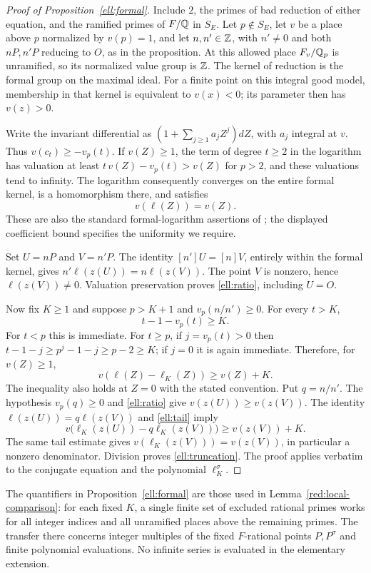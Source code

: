 \begin{proof}[Proof of Proposition~\ref{ell:formal}]
Include $2$, the primes of bad reduction of either equation, and the
ramified primes of $F/\mathbb Q$ in $S_E$.  Let $p\notin S_E$, let $v$ be a
place above $p$ normalized by $v(p)=1$, and let $n,n'\in\mathbb Z$, with
$n'\ne0$ and both $nP,n'P$ reducing to $O$, as in the proposition.
At this allowed place $F_v/\mathbb Q_p$ is
unramified, so its normalized value group is $\mathbb Z$.  The kernel of
reduction is the formal group on the maximal ideal.  For a finite point
on this integral good model, membership in that kernel is equivalent to
$v(x)<0$; its parameter then has $v(z)>0$.

Write the invariant differential as
$(1+\sum_{j\ge1}a_jZ^j)dZ$, with $a_j$ integral at $v$.  Thus
$v(c_t)\ge-v_p(t)$.  If $v(Z)\ge1$, the term of degree $t\ge2$ in the
logarithm has valuation at least $t\,v(Z)-v_p(t)>v(Z)$ for $p>2$, and
these valuations tend to infinity.  The logarithm consequently converges
on the entire formal kernel, is a homomorphism there, and satisfies
\[
                         v(\ell(Z))=v(Z).
\]
These are also the standard formal-logarithm assertions of
\cite[Chapter IV, \S6]{Silverman2009}; the displayed coefficient bound
specifies the uniformity we require.

Set $U=nP$ and $V=n'P$.  The identity $[n']U=[n]V$, entirely within
the formal kernel, gives $n'\ell(z(U))=n\ell(z(V))$.
The point $V$ is nonzero, hence $\ell(z(V))\ne0$.  Valuation preservation
proves \eqref{ell:ratio}, including $U=O$.

Now fix $K\ge1$ and suppose $p>K+1$ and $v_p(n/n')\ge0$.  For every $t>K$,
\begin{equation}\label{ell:tail-exponent}
                           t-1-v_p(t)\ge K.
\end{equation}
For $t<p$ this is immediate.  For $t\ge p$, if $j=v_p(t)>0$ then
$t-1-j\ge p^j-1-j\ge p-2\ge K$; if $j=0$ it is again immediate.
Therefore, for $v(Z)\ge1$,
\begin{equation}\label{ell:tail}
                 v(\ell(Z)-\ell_K(Z))\ge v(Z)+K.
\end{equation}
The inequality also holds at $Z=0$ with the stated convention.  Put
$q=n/n'$.  The hypothesis $v_p(q)\ge0$ and \eqref{ell:ratio} give
$v(z(U))\ge v(z(V))$.  The identity $\ell(z(U))=q\ell(z(V))$ and
\eqref{ell:tail} imply
\[
          v\bigl(\ell_K(z(U))-q\ell_K(z(V))\bigr)
                                    \ge v(z(V))+K.
\]
The same tail estimate gives
$v(\ell_K(z(V)))=v(z(V))$, in particular a nonzero denominator.
Division proves \eqref{ell:truncation}.  The proof applies verbatim to
the conjugate equation and the polynomial $\ell_K^\sigma$.
\end{proof}

The quantifiers in Proposition~\ref{ell:formal} are those used in
Lemma~\ref{red:local-comparison}: for each fixed \(K\), a single finite
set of excluded rational primes works for all integer indices and all
unramified places above the remaining primes.  The transfer there concerns
integer multiples of the fixed \(F\)-rational points \(P,P^\sigma\)
and finite polynomial evaluations.
No infinite series is evaluated in the elementary extension.
